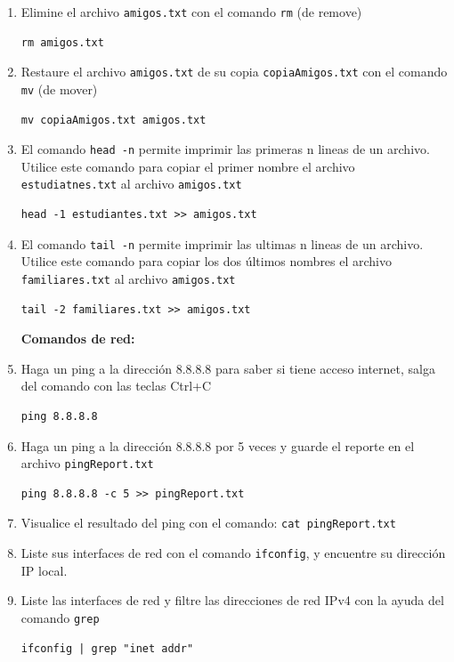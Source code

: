 \documentclass[10pt,letterpaper]{article}
\begin{document}
\begin{enumerate}
\item Elimine el archivo \verb|amigos.txt| con el comando \verb|rm| (de remove)
\begin{verbatim}
rm amigos.txt
\end{verbatim}

\item Restaure el archivo \verb|amigos.txt| de su copia \verb|copiaAmigos.txt| con el comando \verb|mv| (de mover)
\begin{verbatim}
mv copiaAmigos.txt amigos.txt
\end{verbatim}

\item El comando \verb|head -n| permite imprimir las primeras n lineas de un archivo. Utilice este comando para copiar el primer nombre el archivo \verb|estudiatnes.txt| al archivo \verb|amigos.txt|
\begin{verbatim}
head -1 estudiantes.txt >> amigos.txt
\end{verbatim}

\item El comando \verb|tail -n| permite imprimir las ultimas n lineas de un archivo. Utilice este comando para copiar los dos últimos nombres el archivo \verb|familiares.txt| al archivo \verb|amigos.txt|
\begin{verbatim}
tail -2 familiares.txt >> amigos.txt
\end{verbatim}

\textbf{Comandos de red:}

\item Haga un ping a la dirección 8.8.8.8 para saber si tiene acceso internet, salga del comando con las teclas Ctrl+C
\begin{verbatim}
ping 8.8.8.8
\end{verbatim}


\item Haga un ping a la dirección 8.8.8.8 por 5 veces y guarde el reporte en el archivo \verb|pingReport.txt|
\begin{verbatim}
ping 8.8.8.8 -c 5 >> pingReport.txt
\end{verbatim}

\item Visualice el resultado del ping con el comando: \verb|cat pingReport.txt|

\item Liste sus interfaces de red con el comando \verb|ifconfig|, y encuentre su dirección IP local.

\item Liste las interfaces de red y filtre las direcciones de red IPv4 con la ayuda del comando \verb|grep|
\begin{verbatim}
ifconfig | grep "inet addr"
\end{verbatim}



\end{enumerate}
\end{document}
